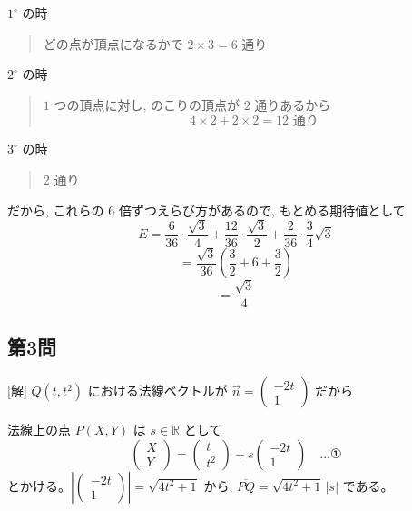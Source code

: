\documentclass[../main.tex]{subfiles}
\begin{document}
$1^\circ$ の時
\begin{quote}
  どの点が頂点になるかで $2 \times 3 = 6$ 通り
\end{quote}

$2^\circ$ の時
\begin{quote}
  $1$ つの頂点に対し, のこりの頂点が $2$ 通りあるから
  \[
    4 \times 2 + 2 \times 2 = 12 \text{ 通り}
  \]
\end{quote}

$3^\circ$ の時
\begin{quote}
  $2$ 通り
\end{quote}

だから, これらの $6$ 倍ずつえらび方があるので, もとめる期待値として
\[
  E = \frac{6}{36} \cdot \frac{\sqrt{3}}{4} + \frac{12}{36} \cdot \frac{\sqrt{3}}{2} + \frac{2}{36} \cdot \frac{3}{4}\sqrt{3}
\]
\[
  = \frac{\sqrt{3}}{36} \left( \frac{3}{2} + 6 + \frac{3}{2} \right)
\]
\[
  = \frac{\sqrt{3}}{4}
\]

\begin{center}
\end{center}

\subsection*{第3問}

[解] $Q(t, t^2)$ における法線ベクトルが $\vec{n} =
\begin{pmatrix} -2t \\ 1
\end{pmatrix}$ だから

法線上の点 $P(X, Y)$ は $s \in \mathbb{R}$ として
\[
  \begin{pmatrix} X \\ Y
  \end{pmatrix} =
  \begin{pmatrix} t \\ t^2
  \end{pmatrix} + s
  \begin{pmatrix} -2t \\ 1
  \end{pmatrix} \quad \dots \text{①}
\]
とかける。$\left|
\begin{pmatrix} -2t \\ 1
\end{pmatrix} \right| = \sqrt{4t^2+1}$ から, $\overline{PQ} = \sqrt{4t^2+1} \, |s|$ である。
\end{document}
